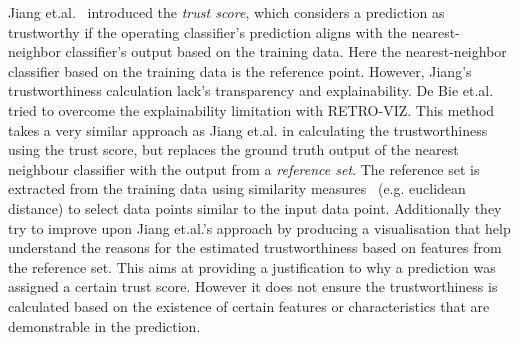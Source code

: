 Jiang et.al.~\cite{Jiang2018} introduced the \textit{trust score}, which considers a prediction as trustworthy if the operating classifier's prediction aligns with the nearest-neighbor classifier's output based on the training data. Here the nearest-neighbor classifier based on the training data is the reference point. However, Jiang's trustworthiness calculation lack's transparency and explainability.
%
De Bie et.al.~\cite{DeBie2021} tried to overcome the explainability limitation with RETRO-VIZ. This method takes a very similar approach as Jiang et.al.\cite{Jiang2018} in calculating the trustworthiness using the trust score, but replaces the ground truth output of the nearest neighbour classifier with the output from a \textit{reference set}. The reference set is extracted from the training data using similarity measures~\cite{Hond2020} (e.g. euclidean distance) to select data points similar to the input data point. 
%
Additionally they try to improve upon Jiang et.al.'s approach by producing a visualisation that help understand the reasons for the estimated trustworthiness based on features from the reference set. This aims at providing a justification to why a prediction was assigned a certain trust score. However it does not ensure the trustworthiness is calculated based on the existence of certain features or characteristics that are demonstrable in the prediction.%

